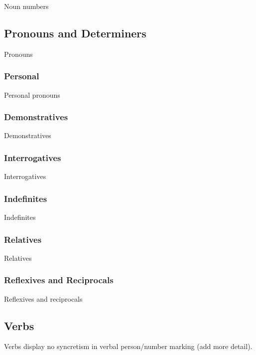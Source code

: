 Noun numbers

\subsection{Pronouns and Determiners}
\label{sec:pronouns-determiners}

Pronouns

\subsubsection{Personal}
\label{sec:pn-personal}

Personal pronouns

\subsubsection{Demonstratives}
\label{sec:pn-demonstratives}

Demonstratives

\subsubsection{Interrogatives}
\label{sec:pn-interrogatives}

Interrogatives

\subsubsection{Indefinites}
\label{sec:pn-indefinites}

Indefinites

\subsubsection{Relatives}
\label{sec:pn-relatives}

Relatives

\subsubsection{Reflexives and Reciprocals}
\label{sec:pn-reflexives-reciprocals}

Reflexives and reciprocals

\subsection{Verbs}
\label{sec:verbs}

Verbs display no syncretism in verbal person/number marking\autocite{wals-29} (add more detail).

